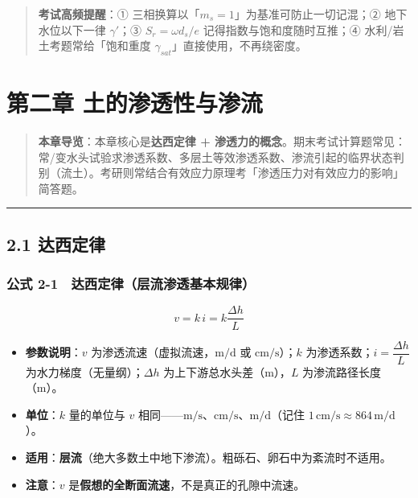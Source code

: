 \documentclass[
]{article}
\providecommand{\tightlist}{%
  \setlength{\itemsep}{0pt}\setlength{\parskip}{0pt}}
\begin{document}
\begin{quote}
\textbf{考试高频提醒}：① 三相换算以「\(m_s=1\)」为基准可防止一切记混；②
地下水位以下一律 \(\gamma'\)；③ \(S_r=\omega d_s/e\)
记得指数与饱和度随时互推；④ 水利/岩土考题常给「饱和重度
\(\gamma_{sat}\)」直接使用，不再绕密度。
\end{quote}

\newpage

\section{第二章
土的渗透性与渗流}\label{ux7b2cux4e8cux7ae0-ux571fux7684ux6e17ux900fux6027ux4e0eux6e17ux6d41}

\begin{quote}
\textbf{本章导览}：本章核心是\textbf{达西定律 +
渗透力的概念}。期末考试计算题常见：常/变水头试验求渗透系数、多层土等效渗透系数、渗流引起的临界状态判别（流土）。考研则常结合有效应力原理考「渗透压力对有效应力的影响」简答题。
\end{quote}

\begin{center}\rule{0.5\linewidth}{0.5pt}\end{center}

\subsection{2.1 达西定律}\label{ux8fbeux897fux5b9aux5f8b}

\subsubsection{公式
2-1　达西定律（层流渗透基本规律）}\label{ux516cux5f0f-2-1-ux8fbeux897fux5b9aux5f8bux5c42ux6d41ux6e17ux900fux57faux672cux89c4ux5f8b}

\[v=k\,i=k\frac{\Delta h}{L}\]

\begin{itemize}
\tightlist
\item
  \textbf{参数说明}：\(v\) 为渗透流速（虚拟流速，\(\mathrm{m/d}\) 或
  \(\mathrm{cm/s}\)）；\(k\) 为渗透系数；\(i=\dfrac{\Delta h}{L}\)
  为水力梯度（无量纲）；\(\Delta h\) 为上下游总水头差（m），\(L\)
  为渗流路径长度（m）。
\item
  \textbf{单位}：\(k\) 量的单位与 \(v\)
  相同------\(\mathrm{m/s}\)、\(\mathrm{cm/s}\)、\(\mathrm{m/d}\)（记住
  \(1\,\mathrm{cm/s}\approx864\,\mathrm{m/d}\)）。
\item
  \textbf{适用}：\textbf{层流}（绝大多数土中地下渗流）。粗砾石、卵石中为紊流时不适用。
\item
  \textbf{注意}：\(v\)
  是\textbf{假想的全断面流速}，不是真正的孔隙中流速。
\end{itemize}
\end{document}
